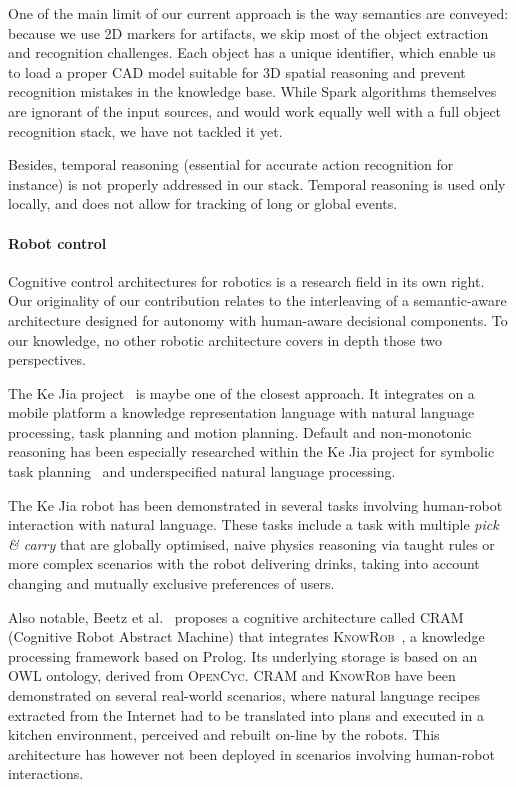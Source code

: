 \documentclass[preprint,3p,times]{elsarticle}
\begin{document}
One of the main limit of our current approach is the way semantics are
conveyed: because we use 2D markers for artifacts, we skip most of the object
extraction and recognition challenges. Each object has a unique identifier,
which enable us to load a proper CAD model suitable for 3D spatial reasoning
and prevent recognition mistakes in the knowledge base. While {\sc Spark}
algorithms themselves are ignorant of the input sources, and would work equally
well with a full object recognition stack, we have not tackled it yet.

Besides, temporal reasoning (essential for accurate action recognition for
instance) is not properly addressed in our stack. Temporal reasoning is used
only locally, and does not allow for tracking of long or global events.

\paragraph{Robot control}

Cognitive control architectures for robotics is a research field in its own right.
Our originality of our contribution relates to the interleaving of a
semantic-aware architecture designed for autonomy with human-aware decisional
components. To our knowledge, no other robotic architecture covers in depth
those two perspectives.

The Ke Jia project~\cite{Chen2010} is maybe one of the closest approach. It
integrates on a mobile platform a knowledge representation language with
natural language processing, task planning and motion planning. Default and
non-monotonic reasoning has been especially researched within the Ke Jia
project for symbolic task planning~\cite{Ji2011} and underspecified natural
language processing.

The Ke Jia robot has been demonstrated in several tasks involving human-robot
interaction with natural language. These tasks include a task with multiple
\emph{pick \& carry} that are globally optimised, naive physics reasoning via
taught rules or more complex scenarios with the robot delivering drinks, taking
into account changing and mutually exclusive preferences of users.

Also notable, Beetz et al.~\cite{Beetz2010} proposes a cognitive architecture
called \textsc{CRAM} (Cognitive Robot Abstract Machine) that integrates
\textsc{KnowRob}~\cite{Tenorth2009a}, a knowledge processing framework based on
Prolog. Its underlying storage is based on an OWL ontology, derived from
\textsc{OpenCyc}. \textsc{CRAM} and \textsc{KnowRob} have been demonstrated on
several real-world scenarios, where natural language recipes extracted from the
Internet had to be translated into plans and executed in a kitchen environment,
perceived and rebuilt on-line by the robots. This architecture has however not
been deployed in scenarios involving human-robot interactions.
\end{document}
